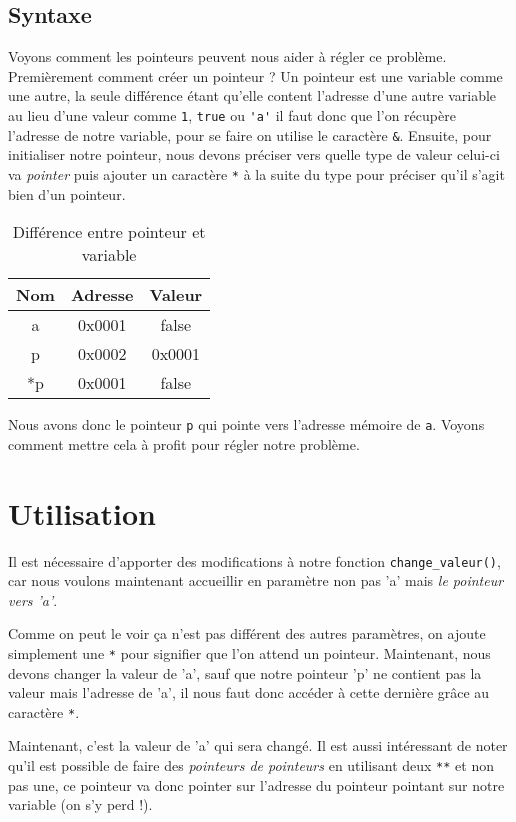 \subsection{Syntaxe}
Voyons comment les pointeurs peuvent nous aider à régler ce problème. Premièrement comment créer un pointeur ? Un pointeur est une variable comme une autre, la seule différence étant qu'elle content l'adresse d'une autre variable au lieu d'une valeur comme \lstinline|1|, \lstinline|true| ou \lstinline|'a'| il faut donc que l'on récupère l'adresse de notre variable, pour se faire on utilise le caractère \lstinline|&|. Ensuite, pour initialiser notre pointeur, nous devons préciser vers quelle type de valeur celui-ci va \emph{pointer} puis ajouter un caractère \lstinline|*| à la suite du type pour préciser qu'il s'agit bien d'un pointeur.



\begin{table}[ht]
	\centering
	\begin{tabular}{|c|c|c|}
		\hline
		Nom & Adresse & Valeur \\ \hline
		a   & 0x0001  & false  \\ \hline
		p   & 0x0002  & 0x0001 \\ \hline
		*p  & 0x0001  & false  \\ \hline
	\end{tabular}
	\caption{Différence entre pointeur et variable}
	\label{pointeur_variable}
\end{table}

Nous avons donc le pointeur \lstinline|p| qui pointe vers l'adresse mémoire de \lstinline|a|. Voyons comment mettre cela à profit pour régler notre problème.

\section{Utilisation}
Il est nécessaire d'apporter des modifications à notre fonction \lstinline|change_valeur()|, car nous voulons maintenant accueillir en paramètre non pas 'a' mais \emph{le pointeur vers 'a'}.



Comme on peut le voir ça n'est pas différent des autres paramètres, on ajoute simplement une \lstinline|*| pour signifier que l'on attend un pointeur. Maintenant, nous devons changer la valeur de 'a', sauf que notre pointeur 'p' ne contient pas la valeur mais l'adresse de 'a', il nous faut donc accéder à cette dernière grâce au caractère \lstinline|*|.



Maintenant, c'est la valeur de 'a' qui sera changé. Il est aussi intéressant de noter qu'il est possible de faire des \emph{pointeurs de pointeurs} en utilisant deux \lstinline|**| et non pas une, ce pointeur va donc pointer sur l'adresse du pointeur pointant sur notre variable (on s'y perd !).